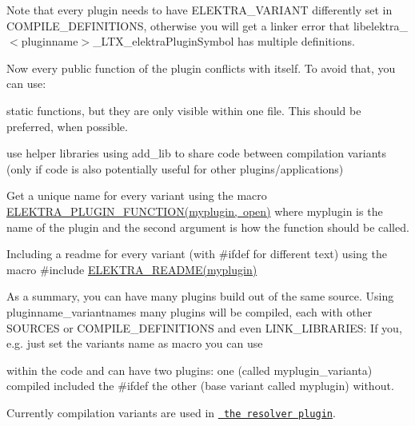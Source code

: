 Note that every plugin needs to have {\ttfamily E\+L\+E\+K\+T\+R\+A\+\_\+\+V\+A\+R\+I\+A\+NT} differently set in {\ttfamily C\+O\+M\+P\+I\+L\+E\+\_\+\+D\+E\+F\+I\+N\+I\+T\+I\+O\+NS}, otherwise you will get a linker error that {\ttfamily libelektra\+\_\+$<$pluginname$>$\+\_\+\+L\+T\+X\+\_\+elektra\+Plugin\+Symbol} has multiple definitions.

Now every public function of the plugin conflicts with itself. To avoid that, you can use\+:


\begin{DoxyItemize}
\item static functions, but they are only visible within one file. This should be preferred, when possible.
\item use helper libraries using {\ttfamily add\+\_\+lib} to share code between compilation variants (only if code is also potentially useful for other plugins/applications)
\item Get a unique name for every variant using the macro {\ttfamily \mbox{\hyperlink{group__plugin_gacb05c902e4014535589db4193da87460}{E\+L\+E\+K\+T\+R\+A\+\_\+\+P\+L\+U\+G\+I\+N\+\_\+\+F\+U\+N\+C\+T\+I\+O\+N(myplugin, open)}}} where myplugin is the name of the plugin and the second argument is how the function should be called.
\item Including a readme for every variant (with {\ttfamily \#ifdef} for different text) using the macro {\ttfamily \#include \mbox{\hyperlink{group__plugin_gabdcb97b05a83130c32bbde75db80fc50}{E\+L\+E\+K\+T\+R\+A\+\_\+\+R\+E\+A\+D\+M\+E(myplugin)}}}
\end{DoxyItemize}

As a summary, you can have many plugins build out of the same source. Using {\ttfamily pluginname\+\_\+variantnames} many plugins will be compiled, each with other {\ttfamily S\+O\+U\+R\+C\+ES} or {\ttfamily C\+O\+M\+P\+I\+L\+E\+\_\+\+D\+E\+F\+I\+N\+I\+T\+I\+O\+NS} and even {\ttfamily L\+I\+N\+K\+\_\+\+L\+I\+B\+R\+A\+R\+I\+ES}\+: If you, e.\+g. just set the variants name as macro you can use


\begin{DoxyCode}{0}
\DoxyCodeLine{\textcolor{preprocessor}{\#ifdef varianta}}
\DoxyCodeLine{\textcolor{preprocessor}{\#endif}}
\end{DoxyCode}


within the code and can have two plugins\+: one (called {\ttfamily myplugin\+\_\+varianta}) compiled included the {\ttfamily \#ifdef} the other (base variant called {\ttfamily myplugin}) without.

Currently compilation variants are used in \href{https://master.libelektra.org/src/plugins/resolver/resolver.c}{\texttt{ the resolver plugin}}. 